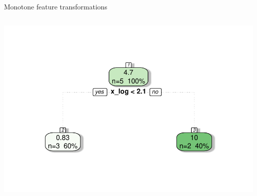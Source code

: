 \documentclass[11pt,compress,t,notes=noshow, xcolor=table]{beamer}
\newenvironment{knitrout}{}{} %
\begin{document}
\begin{vbframe}{Monotone feature transformations}
\begin{columns}[T]
\begin{knitrout}
\end{knitrout}
\includegraphics[width = \textwidth]{figure/cart_splitcomp_2}
\end{columns}
\vspace{0.5cm}
\centering
\end{vbframe}
\end{document}
